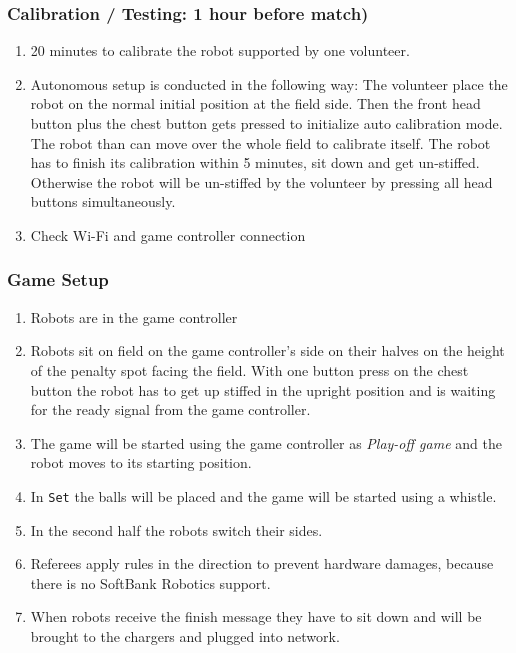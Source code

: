 \subsubsection{Calibration / Testing: 1 hour before match)}

    \begin{enumerate}
        \item 20 minutes to calibrate the robot supported by one volunteer.
        \item Autonomous setup is conducted in the following way: The volunteer place the robot on the normal initial position at the field side. Then the front head button plus the chest button gets pressed to initialize auto calibration mode. The robot than can move over the whole field to calibrate itself. The robot has to finish its calibration within 5 minutes, sit down and get un-stiffed. Otherwise the robot will be un-stiffed by the volunteer by pressing all head buttons simultaneously. 
        \item  Check Wi-Fi and game controller connection
    \end{enumerate}

\subsubsection{Game Setup}

	\begin{enumerate}
		\item Robots are in the game controller
		\item Robots sit on field on the game controller's side on their halves on the height of the penalty spot facing the field. With one button press on the chest button the robot has to get up stiffed in the upright position and is waiting for the ready signal from the game controller.
		\item The game will be started using the game controller as \textit{Play-off game} and the robot moves to its starting position.
		\item In \texttt{Set} the balls will be placed and the game will be started using a whistle.
		\item In the second half the robots switch their sides.
		\item Referees apply rules in the direction to prevent hardware damages, because there is no SoftBank Robotics support.
		\item When robots receive the finish message they have to sit down and will be brought to the chargers and plugged into network.
	\end{enumerate}
	
